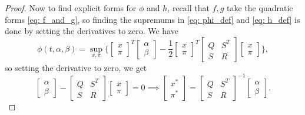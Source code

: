 \begin{proof}
Now to find explicit forms for $\phi$ and $h$, recall that $f, g$ take the quadratic forms \cref{eq: f_and_g}, so finding the supremums in \cref{eq: phi_def} and \cref{eq: h_def} is done by setting the derivatives to zero. We have
\begin{equation*}
    \phi(t, \alpha, \beta) = \sup_{x, \pi} \bigg\{
    \begin{bmatrix}
        x\\
        \pi
    \end{bmatrix}^T
    \begin{bmatrix}
        \alpha\\
        \beta
    \end{bmatrix} - \frac12
    \begin{bmatrix}
        x\\
        \pi
    \end{bmatrix}^T
    \begin{bmatrix}
        Q & S^T\\
        S & R
    \end{bmatrix}
    \begin{bmatrix}
        x\\
        \pi
    \end{bmatrix}
    \bigg\},
\end{equation*}
so setting the derivative to zero, we get
\begin{equation*}
    \begin{bmatrix}
        \alpha\\
        \beta
    \end{bmatrix} - 
    \begin{bmatrix}
        Q & S^T\\
        S & R
    \end{bmatrix}
    \begin{bmatrix}
        x\\
        \pi
    \end{bmatrix}
    = 0 \implies 
    \begin{bmatrix}
        x^\ast\\
        \pi^\ast
    \end{bmatrix} = 
    \begin{bmatrix}
        Q & S^T\\
        S & R
    \end{bmatrix}^{-1}
    \begin{bmatrix}
        \alpha\\
        \beta
    \end{bmatrix}.

\end{equation*}
\end{proof}
